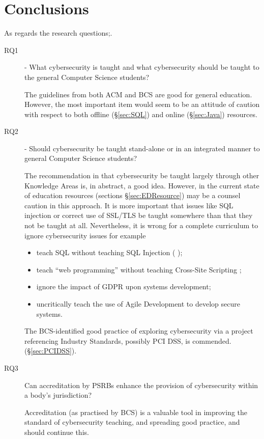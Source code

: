 \documentclass[conference]{IEEEtran}
\begin{document}
\section{Conclusions}
As regards the research questions;.
\begin{description}
\item[RQ1] - What cybersecurity is taught and what cybersecurity should be taught to the general Computer Science students?

The guidelines from both ACM and BCS are good for general education. However, the most important item would seem to be an attitude of caution with respect to both offline (\S\ref{sec:SQL}) and online (\S\ref{sec:Java}) resources. 
\item[RQ2] - Should cybersecurity be taught stand-alone or in an integrated manner to general Computer Science students?

The recommendation in \cite[p. 98]{ACM2013a} that cybersecurity be taught largely through other Knowledge Areas is, in abstract, a good idea.  However, in the current state of education resources (sections \S\ref{sec:EDResource})  may be a counsel caution in this approach.  It is more important that issues like SQL injection \cite{Drop2019} or correct use of SSL/TLS \cite{Chenetal2019a} be taught somewhere than that they not be taught at all.
Nevertheless, it is wrong for a complete curriculum to ignore cybersecurity issues for example
\begin{itemize}
	\item teach SQL without teaching SQL Injection (\cite{Drop2019} );
	\item teach ``web programming'' without teaching Cross-Site Scripting \cite[(XSS)]{OWASP2017a};
	\item ignore the  impact of GDPR upon systems development;
	\item uncritically teach the use of Agile Development to develop secure systems.
\end{itemize}
\par
The BCS-identified good practice of exploring cybersecurity via a project referencing Industry Standards, possibly PCI DSS, is commended.(\S\ref{sec:PCIDSS}).
\item[RQ3] Can accreditation by PSRBs enhance the provision of cybersecurity within a body's jurisdiction?

Accreditation (as practised by BCS) is a valuable tool in improving the standard of cybersecurity teaching, and spreading good practice, and should continue this. 
\end{description}
\end{document}
